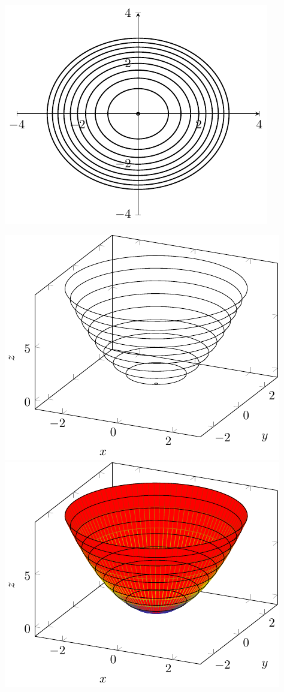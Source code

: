 {\centering 
    \includegraphics[scale=1]{tikz-pictures/section-9.1-again-pic3-level-curves-elliptic-paraboloid-1.pdf}
\par} 

\begin{center}
    \includegraphics[scale=1]{tikz-pictures/section-9.1-again-pic3-level-curves-elliptic-paraboloid-2.pdf} 
    \hfill 
    \includegraphics[scale=1]{tikz-pictures/section-9.1-again-pic3-level-curves-elliptic-paraboloid-3.pdf}\label{img:tikz-paraboloid}
\end{center}

